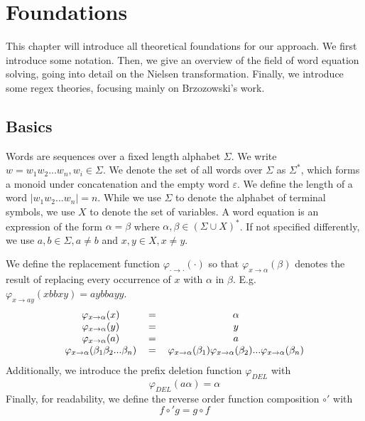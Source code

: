 \chapter{Foundations} \label{ch_foundations}
\vspace{-0.45cm}
This chapter will introduce all theoretical foundations for our approach. We first introduce some notation. Then, we give an overview of the field of word equation solving, going into detail on the Nielsen transformation. Finally, we introduce some regex theories, focusing mainly on Brzozowski's work.

\section{Basics}
Words are sequences over a fixed length alphabet $\Sigma$. We write $w = w_1w_2...w_n, w_i \in \Sigma$. We denote the set of all words over $\Sigma$ as $\Sigma^*$, which forms a monoid under concatenation and the empty word $\varepsilon$. We define the length of a word $|w_1w_2...w_n| = n$.
While we use $\Sigma$ to denote the alphabet of terminal symbols, we use $X$ to denote the set of variables.
A word equation is an expression of the form $\alpha = \beta$ where $\alpha, \beta \in (\Sigma \cup X)^*$. If not specified differently, we use $a, b \in \Sigma, a \neq b$ and $x, y \in X, x \neq y$.

We define the replacement function $\varphi_{\cdot \rightarrow \cdot}(\cdot)$ so that $\varphi_{x \rightarrow \alpha}(\beta)$ denotes the result of replacing every occurrence of $x$ with $\alpha$ in $\beta$. E.g. $\varphi_{x \rightarrow ay}(xbbxy) = aybbayy$.
\[
\begin{tabular}{c c c}
    $\varphi_{x \rightarrow \alpha}(x)$ & $=$ & $\alpha$ \\
    $\varphi_{x \rightarrow \alpha}(y)$ & $=$ & $y$ \\
    $\varphi_{x \rightarrow \alpha}(a)$ & $=$ & $a$ \\
    $\varphi_{x \rightarrow \alpha}(\beta_1\beta_2...\beta_n)$ & $=$ & $\varphi_{x \rightarrow \alpha}(\beta_1)\varphi_{x \rightarrow \alpha}(\beta_2)...\varphi_{x \rightarrow \alpha}(\beta_n)$ \\
\end{tabular}
\]
Additionally, we introduce the prefix deletion function $\varphi_{DEL}$ with
\[
    \varphi_{DEL}(a\alpha) = \alpha
\]
Finally, for readability, we define the reverse order function composition $\circ'$ with
\[
    f \circ' g = g \circ f
\]

